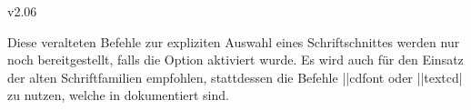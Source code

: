 \begin{Entity}{}
\begin{Changes}{v2.06}
\begin{Obsolete}
  {}
\begin{Obsolete}
  {}
\begin{Obsolete}
  {}
\begin{Obsolete}
  {}
\begin{Obsolete}
  {}
\begin{Obsolete}
  {}
\begin{Obsolete}
  {}
\begin{Obsolete}
  {}
\begin{Obsolete}
  {}
\begin{Obsolete}
  {}
\begin{Obsolete}
  {}
\begin{Obsolete}
  {}
\begin{Obsolete}
  {}
\begin{Obsolete}
  {}
\begin{Obsolete}
  {}
\begin{Obsolete}
  {}
\begin{Obsolete}
  {}
\begin{Obsolete}
  {}
\printdeclarationlist
%
Diese veralteten Befehle zur expliziten Auswahl eines Schriftschnittes werden 
nur noch bereitgestellt, falls die Option  aktiviert wurde. 
Es wird auch für den Einsatz der alten Schriftfamilien empfohlen, stattdessen 
die Befehle \Macro||{cdfont} oder \Macro||{textcd|} zu nutzen, 
welche in  dokumentiert sind.
\end{Obsolete}
\end{Obsolete}
\end{Obsolete}
\end{Obsolete}
\end{Obsolete}
\end{Obsolete}
\end{Obsolete}
\end{Obsolete}
\end{Obsolete}
\end{Obsolete}
\end{Obsolete}
\end{Obsolete}
\end{Obsolete}
\end{Obsolete}
\end{Obsolete}
\end{Obsolete}
\end{Obsolete}
\end{Obsolete}



\end{Changes}
\end{Entity}
